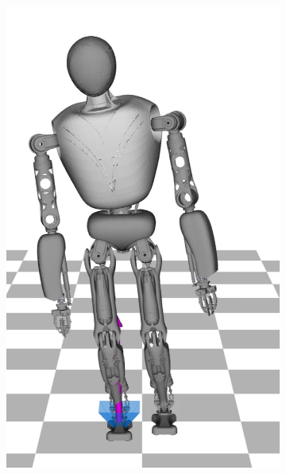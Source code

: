\begin{figure}
\begin{subfigure}{.16\textwidth}
	\includegraphics[width=1\linewidth]{fig/walkStatic/snaps/6}
	\caption{}
\end{subfigure}%
\begin{subfigure}{.16\textwidth}

\end{subfigure}
\end{figure}
